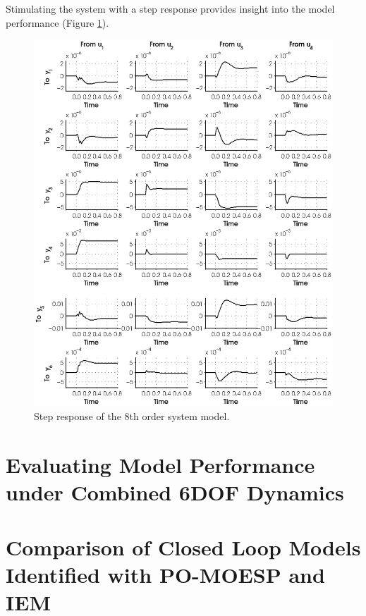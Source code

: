 Stimulating the system with a step response provides insight into the model performance (Figure \ref{fig:5_step}).
\begin{figure}[htb!]\label{fig:5_step}
	\centering
	\includegraphics{../fig/step_resp_parsim.eps}
	\caption{Step response of the 8th order system model.}
\end{figure}



\section{Evaluating Model Performance under Combined 6DOF Dynamics}



\section{Comparison of Closed Loop Models Identified with PO-MOESP and IEM}

